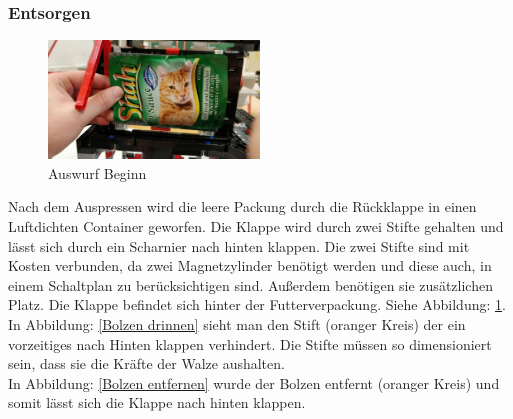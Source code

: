 \subsubsection{Entsorgen}

\begin{figure}
\vspace{-30pt}
  \begin{center}
    \includegraphics[width=0.50\textwidth]{Bilder/Ablauf_1_png/Auswurf_1}
  \end{center}
  \caption{Auswurf Beginn}
  \label{Auswurf Beginn}
  \vspace{-10pt}
\end{figure}

Nach dem Auspressen wird die leere Packung durch die Rückklappe in einen Luftdichten Container geworfen. Die Klappe wird durch zwei Stifte gehalten und lässt sich durch ein Scharnier nach hinten klappen. Die zwei Stifte sind mit Kosten verbunden, da zwei Magnetzylinder benötigt werden und diese auch, in einem Schaltplan zu berücksichtigen sind. Außerdem benötigen sie zusätzlichen Platz. Die Klappe befindet sich hinter der Futterverpackung. Siehe Abbildung: \ref{Auswurf Beginn}. \\

In Abbildung: \ref{Bolzen drinnen} sieht man den Stift (oranger Kreis) der ein vorzeitiges nach Hinten klappen verhindert. Die Stifte müssen so dimensioniert sein, dass sie die Kräfte der Walze aushalten. \\

In Abbildung: \ref{Bolzen entfernen} wurde der Bolzen entfernt (oranger Kreis) und somit lässt sich die Klappe nach hinten klappen. 

